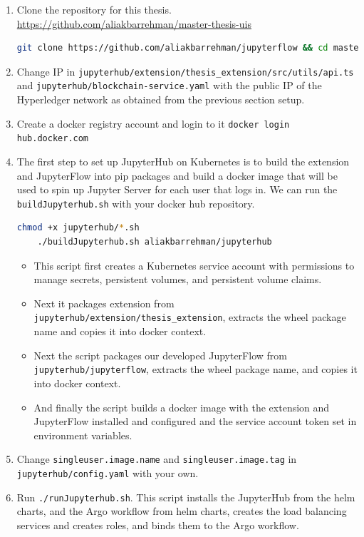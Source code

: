 \begin{enumerate}
    \item Clone the repository for this thesis. \url{https://github.com/aliakbarrehman/master-thesis-uis}
    \begin{lstlisting}[language=bash]
    git clone https://github.com/aliakbarrehman/jupyterflow && cd master-thesis-uis\end{lstlisting}
    
    \item Change IP in \lstinline{jupyterhub/extension/thesis_extension/src/utils/api.ts} and
    \lstinline{jupyterhub/blockchain-service.yaml} with the public IP of the Hyperledger network as obtained from the previous section setup.
    
    \item Create a docker registry account and login to it \lstinline{docker login hub.docker.com}
    
    \item The first step to set up JupyterHub on Kubernetes is to build the extension and JupyterFlow into pip packages and build a docker image that will be used to spin up Jupyter Server for each user that logs in. We can run the \lstinline{buildJupyterhub.sh} with your docker hub repository.
    \begin{lstlisting}[language=bash]
    chmod +x jupyterhub/*.sh
    ./buildJupyterhub.sh aliakbarrehman/jupyterhub\end{lstlisting} 
    
    \begin{itemize}
        \item This script first creates a Kubernetes service account with permissions to manage secrets, persistent volumes, and persistent volume claims.
        \item Next it packages extension from \lstinline{jupyterhub/extension/thesis_extension}, extracts the wheel package name and copies it into docker context.
        \item Next the script packages our developed JupyterFlow from \lstinline{jupyterhub/jupyterflow}, extracts the wheel package name, and copies it into docker context.
        \item And finally the script builds a docker image with the extension and JupyterFlow installed and configured and the service account token set in environment variables. 
    \end{itemize} 
    
    \item Change \lstinline{singleuser.image.name} and \lstinline{singleuser.image.tag} in \lstinline{jupyterhub/config.yaml} with your own.
    
    \item Run \lstinline{./runJupyterhub.sh}. This script installs the JupyterHub from the helm charts, and the Argo workflow from helm charts, creates the load balancing services and creates roles, and binds them to the Argo workflow.
\end{enumerate}

